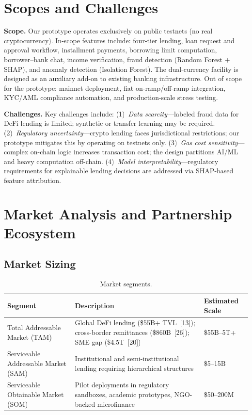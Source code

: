 \documentclass[12pt,a4paper]{report}
\newcommand{\tableheadfont}{\bfseries\small\color{PrimaryBlue}}
\newenvironment{moderntable}[1][H]{%
    \begin{table}[#1]\centering\small%
    \renewcommand{\arraystretch}{1.35}%
}{%
    \end{table}%
}
\begin{document}
\section{Scopes and Challenges}

\textbf{Scope.} Our prototype operates exclusively on public testnets (no real cryptocurrency). In-scope features include: four-tier lending, loan request and approval workflow, installment payments, borrowing limit computation, borrower--bank chat, income verification, fraud detection (Random Forest + SHAP), and anomaly detection (Isolation Forest). The dual-currency facility is designed as an auxiliary add-on to existing banking infrastructure. Out of scope for the prototype: mainnet deployment, fiat on-ramp/off-ramp integration, KYC/AML compliance automation, and production-scale stress testing.

\textbf{Challenges.} Key challenges include: (1)~\textit{Data scarcity}---labeled fraud data for DeFi lending is limited; synthetic or transfer learning may be required. (2)~\textit{Regulatory uncertainty}---crypto lending faces jurisdictional restrictions; our prototype mitigates this by operating on testnets only. (3)~\textit{Gas cost sensitivity}---complex on-chain logic increases transaction cost; the design partitions AI/ML and heavy computation off-chain. (4)~\textit{Model interpretability}---regulatory requirements for explainable lending decisions are addressed via SHAP-based feature attribution.

\section{Market Analysis and Partnership Ecosystem}

\subsection{Market Sizing}

\begin{moderntable}
\caption{Market segments.}
\begin{tabular}{@{} >{\raggedright}p{4cm} >{\raggedright}p{5cm} >{\raggedright\arraybackslash}p{3cm} @{}}
\toprule
\tableheadfont Segment & \tableheadfont Description & \tableheadfont Estimated Scale \\
\midrule
\rowcolor{RowShade}
Total Addressable Market (TAM) & Global DeFi lending (\$55B+ TVL~[13]); cross-border remittances (\$860B~[26]); SME gap (\$4.5T~[20]) & \$55B--5T+ \\
Serviceable Addressable Market (SAM) & Institutional and semi-institutional lending requiring hierarchical structures & \$5--15B \\
\rowcolor{RowShade}
Serviceable Obtainable Market (SOM) & Pilot deployments in regulatory sandboxes, academic prototypes, NGO-backed microfinance & \$50--200M \\
\bottomrule
\end{tabular}
\end{moderntable}
\end{document}
